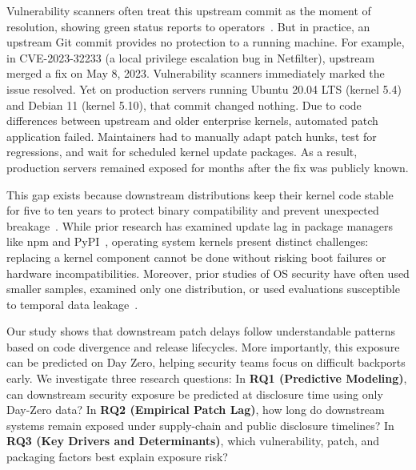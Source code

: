 \documentclass[graybox]{svmult}
\begin{document}
Vulnerability scanners often treat this upstream commit as the moment of resolution, showing green status reports to operators~\cite{gkortzis2021software, decoster2022measuring}. But in practice, an upstream Git commit provides no protection to a running machine. For example, in CVE-2023-32233 (a local privilege escalation bug in Netfilter), upstream merged a fix on May 8, 2023. Vulnerability scanners immediately marked the issue resolved. Yet on production servers running Ubuntu 20.04 LTS (kernel 5.4) and Debian 11 (kernel 5.10), that commit changed nothing. Due to code differences between upstream and older enterprise kernels, automated patch application failed. Maintainers had to manually adapt patch hunks, test for regressions, and wait for scheduled kernel update packages. As a result, production servers remained exposed for months after the fix was publicly known.

This gap exists because downstream distributions keep their kernel code stable for five to ten years to protect binary compatibility and prevent unexpected breakage~\cite{ruohonen2019tracking}. While prior research has examined update lag in package managers like npm and PyPI~\cite{alfadel2021empirical, kula2018empirical, pashchenko2020vulnerable}, operating system kernels present distinct challenges: replacing a kernel component cannot be done without risking boot failures or hardware incompatibilities. Moreover, prior studies of OS security have often used smaller samples, examined only one distribution, or used evaluations susceptible to temporal data leakage~\cite{zimmermann2010predicting}.

Our study shows that downstream patch delays follow understandable patterns based on code divergence and release lifecycles. More importantly, this exposure can be predicted on Day Zero, helping security teams focus on difficult backports early. We investigate three research questions:
In \textbf{RQ1 (Predictive Modeling)}, can downstream security exposure be predicted at disclosure time using only Day-Zero data?
In \textbf{RQ2 (Empirical Patch Lag)}, how long do downstream systems remain exposed under supply-chain and public disclosure timelines?
In \textbf{RQ3 (Key Drivers and Determinants)}, which vulnerability, patch, and packaging factors best explain exposure risk?
\end{document}
